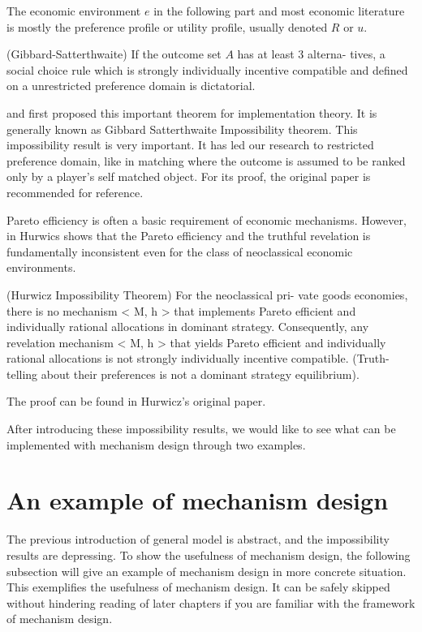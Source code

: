 The economic environment $e$ in the following part and most economic literature is mostly the preference profile or utility profile, usually denoted $R$ or $u$.

\begin{thm*}(Gibbard-Satterthwaite)
  \label{gibbard-satterthwaite}
If the outcome set $A$ has at least 3 alterna-
tives, a social choice rule which is strongly individually incentive compatible and
defined on a unrestricted preference domain is dictatorial.
\end{thm*}

\parencite{Gibbard1973} and \parencite{Satterthwaite1975} first proposed this important theorem for implementation theory. It is generally known as 
Gibbard Satterthwaite Impossibility theorem. This impossibility result is very important. It has led our research to restricted preference domain, like in matching where the outcome is assumed to be ranked only by a player's self matched object. For its proof, the original paper is recommended for reference.

Pareto efficiency is often a basic requirement of economic
mechanisms. However, in \parencite{Hurwicz1972}
Hurwics  shows that  the Pareto efficiency and the truthful revelation is
fundamentally inconsistent even for the class of neoclassical economic
environments.
\begin{thm*}
(Hurwicz Impossibility Theorem) For the neoclassical pri-
vate goods economies, there is no mechanism < M, h > that implements Pareto efficient
and individually rational allocations in dominant strategy. Consequently, any revelation
mechanism < M, h > that yields Pareto efficient and individually rational allocations is
not strongly individually incentive compatible. (Truth-telling about their preferences is not a
dominant strategy equilibrium).
\end{thm*}
The proof can be found in Hurwicz's original paper. 

After introducing these impossibility results, we would like to see what can be implemented with mechanism design through two examples.

\section{An example of  mechanism design}

The previous introduction of general model is abstract, and the impossibility results are depressing. To show the usefulness of mechanism design, the following subsection will give an example of mechanism design in more concrete situation. This exemplifies the usefulness of mechanism design. It can be safely skipped without hindering reading of later chapters if you are familiar with the framework of mechanism design. 

